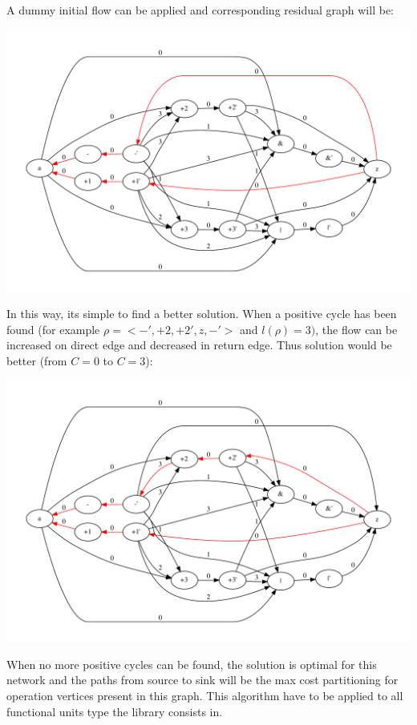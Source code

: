 A dummy initial flow can be applied and corresponding residual graph will be\+:


\begin{DoxyImageNoCaption}
  \mbox{\includegraphics[width=\textwidth,height=\textheight/2,keepaspectratio=true]{dot_inline_dotgraph_19}}
\end{DoxyImageNoCaption}


In this way, it\textquotesingle{}s simple to find a better solution. When a positive cycle has been found (for example $ \rho= <-',+2,+2',z,-'> $ and $ l(\rho )=3) $, the flow can be increased on direct edge and decreased in return edge. Thus solution would be better (from $ C=0 $ to $ C=3 $)\+: 
\begin{DoxyImageNoCaption}
  \mbox{\includegraphics[width=\textwidth,height=\textheight/2,keepaspectratio=true]{dot_inline_dotgraph_20}}
\end{DoxyImageNoCaption}


When no more positive cycles can be found, the solution is optimal for this network and the paths from source to sink will be the max cost partitioning for operation vertices present in this graph. This algorithm have to be applied to all functional units type the library consists in. 